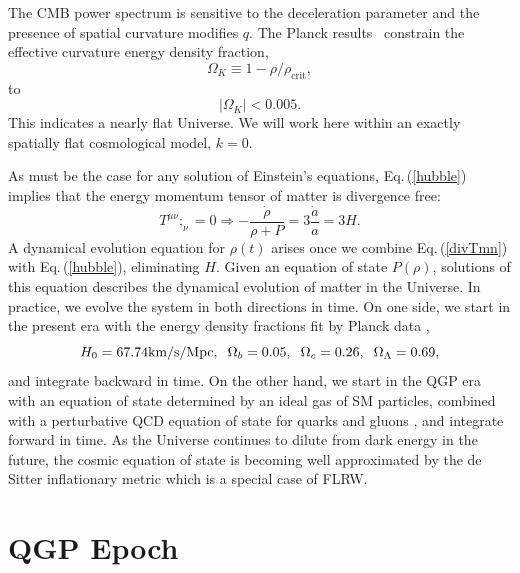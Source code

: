 \documentclass[universe,article,submit,moreauthors,pdftex,a4paper]{Definitions/mdpi}
\newcommand{\beqn}{\begin{equation}}
\newcommand{\eeqn}{\end{equation}}
\newcommand{\req}[1]{Eq.\,(\ref{#1})}
\begin{document}
 The CMB power spectrum is sensitive to the  deceleration parameter  and the presence of spatial curvature modifies $q$. The Planck results~\cite{Planck:2013pxb,Planck:2015fie,Planck:2018vyg} constrain  the effective curvature energy density fraction,
\begin{equation}
\Omega_K\equiv1-\rho/\rho_{\text{crit}},
\end{equation}
to
\begin{equation}
|\Omega_K|<0.005.
\end{equation}
This indicates a nearly flat Universe. We will work here within an exactly spatially flat cosmological model, $k=0$.  


As must be the case for any solution of Einstein's equations,   \req{hubble} implies that the energy momentum tensor of matter is divergence free:
\beqn\label{divTmn}
T^{\mu\nu};_\nu =0 \Rightarrow -\frac{\dot\rho}{\rho+P}=3\frac{\dot a}{a}=3H.
\eeqn
A dynamical evolution equation for $\rho(t)$ arises once we combine \req{divTmn} with \req{hubble},  eliminating $H$.   Given an equation of state $P(\rho)$, solutions of this equation describes the dynamical evolution of matter in the Universe. In practice, we evolve the system in both directions in time.  On one side, we start in the present era with the energy density fractions fit by Planck data \cite{Planck:2013pxb},
\begin{equation}\label{Planck_params}
H_0=67.74\text{km/s/Mpc},\hspace{2mm} \Omega_b=0.05,\hspace{2mm} \Omega_c=0.26, \hspace{2mm}\Omega_\Lambda=0.69,
\end{equation}
 and integrate backward in time.  On the other hand, we start in the QGP era with an equation of state determined by an ideal gas of SM particles, combined with a perturbative QCD equation of state for quarks and gluons \cite{Borsanyi:2013bia}, and integrate forward in time. As the Universe continues to dilute from dark energy in the future, the cosmic equation of state is becoming well approximated by the de Sitter inflationary metric which is a special case of FLRW.



\section{QGP Epoch}\label{sec:QGP}
\end{document}
